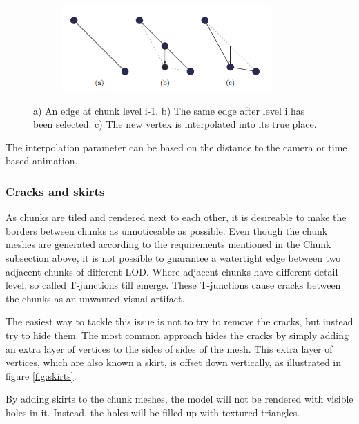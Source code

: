 \begin{figure}[htbp]
    \centering
    \begin{subfigure}[bt]{0.7\textwidth}
        \includegraphics[width=\textwidth]{figures/chunkedlod/switching.png}
    \end{subfigure}
    \caption{a) An edge at chunk level i-1. b) The same edge after level i has been selected. c) The new vertex is interpolated into its true place.}
    \label{fig:lodswitch}
\end{figure}

The interpolation parameter can be based on the distance to the camera or time based animation.

\subsubsection{Cracks and skirts}
As chunks are tiled and rendered next to each other, it is desireable to make the borders between chunks as unnoticeable as possible. Even though the chunk meshes are generated according to the requirements mentioned in the Chunk subsection above, it is not possible to guarantee a watertight edge between two adjacent chunks of different LOD. Where adjacent chunks have different detail level, so called T-junctions till emerge. These T-junctions cause cracks between the chunks as an unwanted visual artifact.

The easiest way to tackle this issue is not to try to remove the cracks, but instead try to hide them. The most common approach hides the cracks by simply adding an extra layer of vertices to the sides of sides of the mesh. This extra layer of vertices, which are also known a skirt, is offset down vertically, as illustrated in figure \ref{fig:skirts}. 

By adding skirts to the chunk meshes, the model will not be rendered with visible holes in it. Instead, the holes will be filled up with textured triangles.

